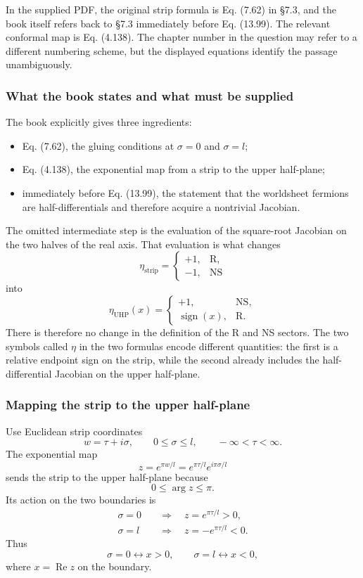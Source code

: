 \documentclass[
  10pt,
  a4paper,
  openany]{book}
\providecommand{\tightlist}{%
  \setlength{\itemsep}{0pt}\setlength{\parskip}{0pt}}
\begin{document}
In the supplied PDF, the original strip formula is Eq. (7.62) in §7.3,
and the book itself refers back to §7.3 immediately before Eq. (13.99).
The relevant conformal map is Eq. (4.138). The chapter number in the
question may refer to a different numbering scheme, but the displayed
equations identify the passage unambiguously.

\subsubsection{What the book states and what must be
supplied}\label{what-the-book-states-and-what-must-be-supplied}

The book explicitly gives three ingredients:

\begin{itemize}
\tightlist
\item
  Eq. (7.62), the gluing conditions at \(\sigma=0\) and \(\sigma=l\);
\item
  Eq. (4.138), the exponential map from a strip to the upper half-plane;
\item
  immediately before Eq. (13.99), the statement that the worldsheet
  fermions are half-differentials and therefore acquire a nontrivial
  Jacobian.
\end{itemize}

The omitted intermediate step is the evaluation of the square-root
Jacobian on the two halves of the real axis. That evaluation is what
changes \[
\eta_{\mathrm{strip}}
=
\begin{cases}
+1,&\mathrm R,\\
-1,&\mathrm{NS}
\end{cases}
\] into \[
\eta_{\mathrm{UHP}}(x)
=
\begin{cases}
+1,&\mathrm{NS},\\
\operatorname{sign}(x),&\mathrm R.
\end{cases}
\] There is therefore no change in the definition of the R and NS
sectors. The two symbols called \(\eta\) in the two formulas encode
different quantities: the first is a relative endpoint sign on the
strip, while the second already includes the half-differential Jacobian
on the upper half-plane.

\subsubsection{Mapping the strip to the upper
half-plane}\label{mapping-the-strip-to-the-upper-half-plane}

Use Euclidean strip coordinates \[
w=\tau+i\sigma,
\qquad
0\leq\sigma\leq l,
\qquad
-\infty<\tau<\infty.
\] The exponential map \[
z=e^{\pi w/l}
=e^{\pi\tau/l}e^{i\pi\sigma/l}
\] sends the strip to the upper half-plane because \[
0\leq\arg z\leq\pi.
\] Its action on the two boundaries is \[
\begin{aligned}
\sigma=0
&\quad\Longrightarrow\quad
z=e^{\pi\tau/l}>0,\\%
\sigma=l
&\quad\Longrightarrow\quad
z=-e^{\pi\tau/l}<0.
\end{aligned}
\] Thus \[
\boxed{
\sigma=0\longleftrightarrow x>0,
\qquad
\sigma=l\longleftrightarrow x<0,
}
\] where \(x=\operatorname{Re}z\) on the boundary.
\end{document}
